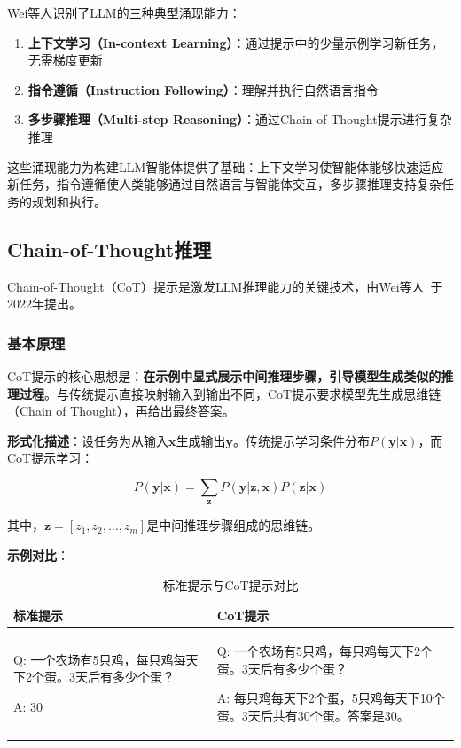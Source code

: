 Wei等人\cite{wei2022emergent}识别了LLM的三种典型涌现能力：

\begin{enumerate}[leftmargin=2em]
    \item \textbf{上下文学习（In-context Learning）}：通过提示中的少量示例学习新任务，无需梯度更新
    \item \textbf{指令遵循（Instruction Following）}：理解并执行自然语言指令
    \item \textbf{多步骤推理（Multi-step Reasoning）}：通过Chain-of-Thought提示进行复杂推理
\end{enumerate}

这些涌现能力为构建LLM智能体提供了基础：上下文学习使智能体能够快速适应新任务，指令遵循使人类能够通过自然语言与智能体交互，多步骤推理支持复杂任务的规划和执行。

\subsection{Chain-of-Thought推理}

Chain-of-Thought（CoT）提示是激发LLM推理能力的关键技术，由Wei等人~\cite{wei2022chain}于2022年提出。

\subsubsection{基本原理}

CoT提示的核心思想是：\textbf{在示例中显式展示中间推理步骤，引导模型生成类似的推理过程}。与传统提示直接映射输入到输出不同，CoT提示要求模型先生成思维链（Chain of Thought），再给出最终答案。

\textbf{形式化描述}：设任务为从输入$\mathbf{x}$生成输出$\mathbf{y}$。传统提示学习条件分布$P(\mathbf{y}|\mathbf{x})$，而CoT提示学习：

\begin{equation}\label{eq:cot_formal}
    P(\mathbf{y}|\mathbf{x}) = \sum_{\mathbf{z}} P(\mathbf{y}|\mathbf{z}, \mathbf{x}) P(\mathbf{z}|\mathbf{x})
\end{equation}

其中，$\mathbf{z} = [z_1, z_2, \ldots, z_m]$是中间推理步骤组成的思维链。

\textbf{示例对比}：

\begin{table}[htbp]
    \centering
    \caption{标准提示与CoT提示对比}\label{tab:cot_example}
    \begin{tabular}{@{}p{}p{}@{}}
        \toprule
        \textbf{标准提示} & \textbf{CoT提示} \\
        \midrule
        Q: 一个农场有5只鸡，每只鸡每天下2个蛋。3天后有多少个蛋？
        
        A: 30 & Q: 一个农场有5只鸡，每只鸡每天下2个蛋。3天后有多少个蛋？
        
        A: 每只鸡每天下2个蛋，5只鸡每天下10个蛋。3天后共有30个蛋。答案是30。 \\
        \bottomrule
    \end{tabular}
\end{table}

